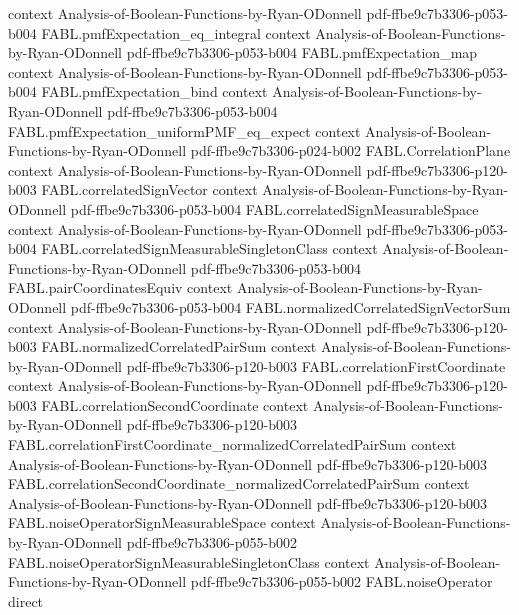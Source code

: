 \begin{theorem}
  {context}
  {Analysis-of-Boolean-Functions-by-Ryan-ODonnell}
  {pdf-ffbe9c7b3306-p053-b004}
\proofstep
  {FABL.pmfExpectation_eq_integral}
  {context}
  {Analysis-of-Boolean-Functions-by-Ryan-ODonnell}
  {pdf-ffbe9c7b3306-p053-b004}
\proofstep
  {FABL.pmfExpectation_map}
  {context}
  {Analysis-of-Boolean-Functions-by-Ryan-ODonnell}
  {pdf-ffbe9c7b3306-p053-b004}
\proofstep
  {FABL.pmfExpectation_bind}
  {context}
  {Analysis-of-Boolean-Functions-by-Ryan-ODonnell}
  {pdf-ffbe9c7b3306-p053-b004}
\proofstep
  {FABL.pmfExpectation_uniformPMF_eq_expect}
  {context}
  {Analysis-of-Boolean-Functions-by-Ryan-ODonnell}
  {pdf-ffbe9c7b3306-p024-b002}
\proofstep
  {FABL.CorrelationPlane}
  {context}
  {Analysis-of-Boolean-Functions-by-Ryan-ODonnell}
  {pdf-ffbe9c7b3306-p120-b003}
\proofstep
  {FABL.correlatedSignVector}
  {context}
  {Analysis-of-Boolean-Functions-by-Ryan-ODonnell}
  {pdf-ffbe9c7b3306-p053-b004}
\proofstep
  {FABL.correlatedSignMeasurableSpace}
  {context}
  {Analysis-of-Boolean-Functions-by-Ryan-ODonnell}
  {pdf-ffbe9c7b3306-p053-b004}
\proofstep
  {FABL.correlatedSignMeasurableSingletonClass}
  {context}
  {Analysis-of-Boolean-Functions-by-Ryan-ODonnell}
  {pdf-ffbe9c7b3306-p053-b004}
\proofstep
  {FABL.pairCoordinatesEquiv}
  {context}
  {Analysis-of-Boolean-Functions-by-Ryan-ODonnell}
  {pdf-ffbe9c7b3306-p053-b004}
\proofstep
  {FABL.normalizedCorrelatedSignVectorSum}
  {context}
  {Analysis-of-Boolean-Functions-by-Ryan-ODonnell}
  {pdf-ffbe9c7b3306-p120-b003}
\proofstep
  {FABL.normalizedCorrelatedPairSum}
  {context}
  {Analysis-of-Boolean-Functions-by-Ryan-ODonnell}
  {pdf-ffbe9c7b3306-p120-b003}
\proofstep
  {FABL.correlationFirstCoordinate}
  {context}
  {Analysis-of-Boolean-Functions-by-Ryan-ODonnell}
  {pdf-ffbe9c7b3306-p120-b003}
\proofstep
  {FABL.correlationSecondCoordinate}
  {context}
  {Analysis-of-Boolean-Functions-by-Ryan-ODonnell}
  {pdf-ffbe9c7b3306-p120-b003}
\proofstep
  {FABL.correlationFirstCoordinate_normalizedCorrelatedPairSum}
  {context}
  {Analysis-of-Boolean-Functions-by-Ryan-ODonnell}
  {pdf-ffbe9c7b3306-p120-b003}
\proofstep
  {FABL.correlationSecondCoordinate_normalizedCorrelatedPairSum}
  {context}
  {Analysis-of-Boolean-Functions-by-Ryan-ODonnell}
  {pdf-ffbe9c7b3306-p120-b003}
\proofstep
  {FABL.noiseOperatorSignMeasurableSpace}
  {context}
  {Analysis-of-Boolean-Functions-by-Ryan-ODonnell}
  {pdf-ffbe9c7b3306-p055-b002}
\proofstep
  {FABL.noiseOperatorSignMeasurableSingletonClass}
  {context}
  {Analysis-of-Boolean-Functions-by-Ryan-ODonnell}
  {pdf-ffbe9c7b3306-p055-b002}
\proofstep
  {FABL.noiseOperator}
  {direct}

\end{theorem}
